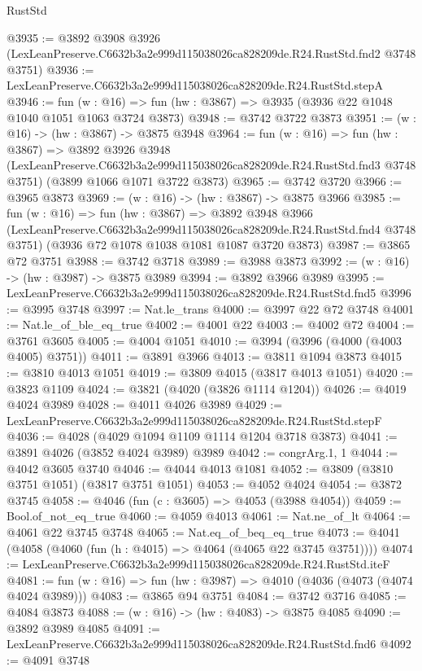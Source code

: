 \begin{lexlean}{RustStd}
\begin{coremodule}
@3935 := @3892
    @3908
    @3926
    (LexLeanPreserve.C6632b3a2e999d115038026ca828209de.R24.RustStd.fnd2 @3748 @3751)
@3936 := LexLeanPreserve.C6632b3a2e999d115038026ca828209de.R24.RustStd.stepA
@3946 := fun (w : @16) => fun (hw : @3867) => @3935 (@3936 @22 @1048 @1040 @1051 @1063 @3724 @3873)
@3948 := @3742 @3722 @3873
@3951 := (w : @16) -> (hw : @3867) -> @3875 @3948
@3964 := fun (w : @16) =>
  fun (hw : @3867) =>
  @3892
    @3926
    @3948
    (LexLeanPreserve.C6632b3a2e999d115038026ca828209de.R24.RustStd.fnd3 @3748 @3751)
    (@3899 @1066 @1071 @3722 @3873)
@3965 := @3742 @3720
@3966 := @3965 @3873
@3969 := (w : @16) -> (hw : @3867) -> @3875 @3966
@3985 := fun (w : @16) =>
  fun (hw : @3867) =>
  @3892
    @3948
    @3966
    (LexLeanPreserve.C6632b3a2e999d115038026ca828209de.R24.RustStd.fnd4 @3748 @3751)
    (@3936 @72 @1078 @1038 @1081 @1087 @3720 @3873)
@3987 := @3865 @72 @3751
@3988 := @3742 @3718
@3989 := @3988 @3873
@3992 := (w : @16) -> (hw : @3987) -> @3875 @3989
@3994 := @3892 @3966 @3989
@3995 := LexLeanPreserve.C6632b3a2e999d115038026ca828209de.R24.RustStd.fnd5
@3996 := @3995 @3748
@3997 := Nat.le_trans
@4000 := @3997 @22 @72 @3748
@4001 := Nat.le_of_ble_eq_true
@4002 := @4001 @22
@4003 := @4002 @72
@4004 := @3761 @3605
@4005 := @4004 @1051
@4010 := @3994 (@3996 (@4000 (@4003 @4005) @3751))
@4011 := @3891 @3966
@4013 := @3811 @1094 @3873
@4015 := @3810 @4013 @1051
@4019 := @3809 @4015 (@3817 @4013 @1051)
@4020 := @3823 @1109
@4024 := @3821 (@4020 (@3826 @1114 @1204))
@4026 := @4019 @4024 @3989
@4028 := @4011 @4026 @3989
@4029 := LexLeanPreserve.C6632b3a2e999d115038026ca828209de.R24.RustStd.stepF
@4036 := @4028 (@4029 @1094 @1109 @1114 @1204 @3718 @3873)
@4041 := @3891 @4026 (@3852 @4024 @3989) @3989
@4042 := congrArg.{1, 1}
@4044 := @4042 @3605 @3740
@4046 := @4044 @4013 @1081
@4052 := @3809 (@3810 @3751 @1051) (@3817 @3751 @1051)
@4053 := @4052 @4024
@4054 := @3872 @3745
@4058 := @4046 (fun (c : @3605) => @4053 (@3988 @4054))
@4059 := Bool.of_not_eq_true
@4060 := @4059 @4013
@4061 := Nat.ne_of_lt
@4064 := @4061 @22 @3745 @3748
@4065 := Nat.eq_of_beq_eq_true
@4073 := @4041 (@4058 (@4060 (fun (h : @4015) => @4064 (@4065 @22 @3745 @3751))))
@4074 := LexLeanPreserve.C6632b3a2e999d115038026ca828209de.R24.RustStd.iteF
@4081 := fun (w : @16) => fun (hw : @3987) => @4010 (@4036 (@4073 (@4074 @4024 @3989)))
@4083 := @3865 @94 @3751
@4084 := @3742 @3716
@4085 := @4084 @3873
@4088 := (w : @16) -> (hw : @4083) -> @3875 @4085
@4090 := @3892 @3989 @4085
@4091 := LexLeanPreserve.C6632b3a2e999d115038026ca828209de.R24.RustStd.fnd6
@4092 := @4091 @3748

\end{coremodule}
\end{lexlean}
